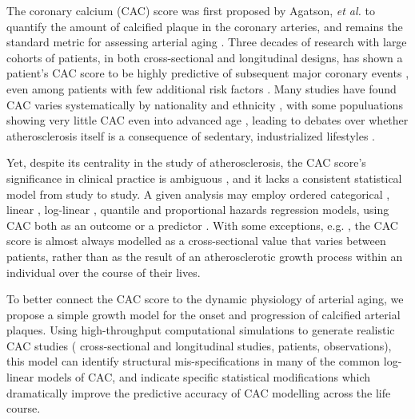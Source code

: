 \documentclass[a4paper, 10pt]{article}
\begin{document}
The coronary calcium (CAC) score was first proposed by Agatson, \textit{et al.} \cite{agatston1990cac} to quantify the amount of calcified plaque in the coronary arteries, and remains the standard metric for assessing arterial aging \cite{berry2012lifetime, nakahara2017calcification}. Three decades of research with large cohorts of patients, in both cross-sectional and longitudinal designs, has shown a patient's CAC score to be highly predictive of subsequent major coronary events \cite{vliegenthart2002rotterdam, kondos2003events, arad2005events, lamonte2005dallas, budoff2007long}, even among patients with few additional risk factors \cite{taylor2005premature, lakoski2007lowriskwomen}. Many studies have found CAC varies systematically by nationality \cite{santos2006international, schmermund2007comparison} and ethnicity \cite{hoff2001trajectories, bild2002mesa, bild2005ethnic, budoff2006ethnic}, with some populuations showing very little CAC even into advanced age \cite{kaplan2017tsimane}, leading to debates over whether atherosclerosis itself is a consequence of sedentary, industrialized lifestyles \cite{thompson2013mummies, gurven2020weird}.

Yet, despite its centrality in the study of atherosclerosis, the CAC score's significance in clinical practice is ambiguous \cite{berman2016beyond, blaha2016improving}, and it lacks a consistent statistical model from study to study. A given analysis may employ ordered categorical \cite{budoff2007long, koulaouzidis2013aggressive, silverman2014extreme, fujiyoshi2014japan}, linear \cite{koulaouzidis2013comparison, budoff2013progression}, log-linear \cite{criqui2014density, mcclelland2015prediction, blaha2016improving, hughesaustin2016relationship}, quantile \cite{ahmed2013mesa, ohmotosekine2016lung} and proportional hazards \cite{nasir2007mortality, folsom2008imt, hou2012prognostic} regression models, using CAC both as an outcome \cite{oei2004risk, arad2005events, kaplan2017tsimane} or a predictor \cite{detrano2008predictor, folsom2008imt}. With some exceptions, e.g. \cite{mcclelland2009arterial, defilippis2011framingham, budoff2013progression, ahmed2013mesa, arguelles2014factors, whelton2015predictors}, the CAC score is almost always modelled as a cross-sectional value that varies between patients, rather than as the result of an atherosclerotic growth process within an individual over the course of their lives.

To better connect the CAC score to the dynamic physiology of arterial aging, we propose a simple growth model for the onset and progression of calcified arterial plaques. Using  high-throughput computational simulations to generate \numStudies{} realistic CAC studies (\numStudiesCross{} cross-sectional and \numStudiesLong{} longitudinal studies, \numPatients{} patients, \numObservations{} observations), this model can identify structural mis-specifications in many of the common log-linear models of CAC, and indicate specific statistical modifications which dramatically improve the predictive accuracy of CAC modelling across the life course.
\end{document}
